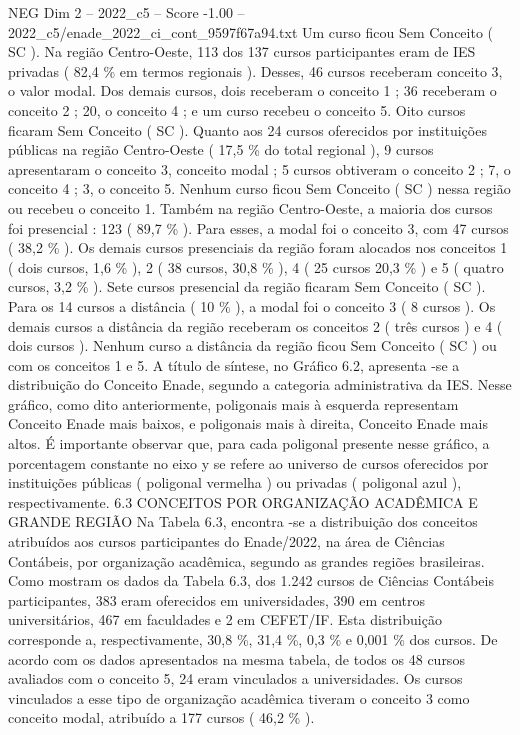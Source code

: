 \begin{textsample}{NEG Dim 2 – 2022\_c5 – Score -1.00 – 2022\_c5/enade\_2022\_ci\_cont\_9597f67a94.txt}
Um curso ficou Sem Conceito ( SC ).
Na região Centro-Oeste, 113 dos 137 cursos participantes eram de IES privadas ( 82,4 \% em termos regionais ).
Desses, 46 cursos receberam conceito 3, o valor modal.
Dos demais cursos, dois receberam o conceito 1 ; 36 receberam o conceito 2 ; 20, o conceito 4 ; e um curso recebeu o conceito 5.
Oito cursos ficaram Sem Conceito ( SC ).
Quanto aos 24 cursos oferecidos por instituições públicas na região Centro-Oeste ( 17,5 \% do total regional ), 9 cursos apresentaram o conceito 3, conceito modal ; 5 cursos obtiveram o conceito 2 ; 7, o conceito 4 ; 3, o conceito 5.
Nenhum curso ficou Sem Conceito ( SC ) nessa região ou recebeu o conceito 1.
Também na região Centro-Oeste, a maioria dos cursos foi presencial : 123 ( 89,7 \% ).
Para esses, a modal foi o conceito 3, com 47 cursos ( 38,2 \% ).
Os demais cursos presenciais da região foram alocados nos conceitos 1 ( dois cursos, 1,6 \% ), 2 ( 38 cursos, 30,8 \% ), 4 ( 25 cursos 20,3 \% ) e 5 ( quatro cursos, 3,2 \% ).
Sete cursos presencial da região ficaram Sem Conceito ( SC ).
Para os 14 cursos a distância ( 10 \% ), a modal foi o conceito 3 ( 8 cursos ).
Os demais cursos a distância da região receberam os conceitos 2 ( três cursos ) e 4 ( dois cursos ).
Nenhum curso a distância da região ficou Sem Conceito ( SC ) ou com os conceitos 1 e 5.
A título de síntese, no Gráfico 6.2, apresenta -se a distribuição do Conceito Enade, segundo a categoria administrativa da IES.
Nesse gráfico, como dito anteriormente, poligonais mais à esquerda representam Conceito Enade mais baixos, e poligonais mais à direita, Conceito Enade mais altos.
É importante observar que, para cada poligonal presente nesse gráfico, a porcentagem constante no eixo y se refere ao universo de cursos oferecidos por instituições públicas ( poligonal vermelha ) ou privadas ( poligonal azul ), respectivamente. 6.3 CONCEITOS POR ORGANIZAÇÃO ACADÊMICA E GRANDE REGIÃO Na Tabela 6.3, encontra -se a distribuição dos conceitos atribuídos aos cursos participantes do Enade/2022, na área de Ciências Contábeis, por organização acadêmica, segundo as grandes regiões brasileiras.
Como mostram os dados da Tabela 6.3, dos 1.242 cursos de Ciências Contábeis participantes, 383 eram oferecidos em universidades, 390 em centros universitários, 467 em faculdades e 2 em CEFET/IF.
Esta distribuição corresponde a, respectivamente, 30,8 \%, 31,4 \%, 0,3 \% e 0,001 \% dos cursos.
De acordo com os dados apresentados na mesma tabela, de todos os 48 cursos avaliados com o conceito 5, 24 eram vinculados a universidades.
Os cursos vinculados a esse tipo de organização acadêmica tiveram o conceito 3 como conceito modal, atribuído a 177 cursos ( 46,2 \% ).

\end{textsample}
